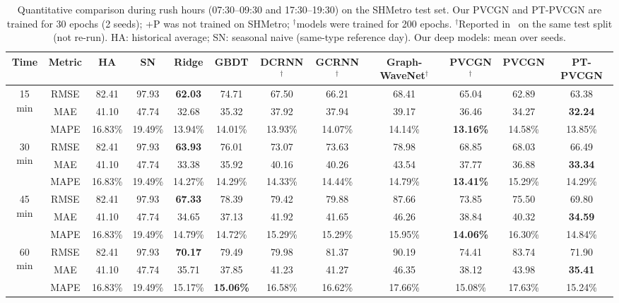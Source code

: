 \begin{table}[t]
\centering
\caption{Quantitative comparison during rush hours (07:30--09:30 and 17:30--19:30) on the SHMetro test set. Our PVCGN and PT-PVCGN are trained for 30 epochs (2 seeds); +P was not trained on SHMetro; $^\dagger$models were trained for 200 epochs. $^\dagger$Reported in~\cite{liu2022pvcgn} on the same test split (not re-run). HA: historical average; SN: seasonal naive (same-type reference day). Our deep models: mean over seeds.}
\label{tab:sh-rush}
\scriptsize
\setlength{\tabcolsep}{3.2pt}
\begin{tabular}{cc|cccc|cccc|cc}
\toprule
Time & Metric & HA & SN & Ridge & GBDT & DCRNN$^\dagger$ & GCRNN$^\dagger$ & Graph-WaveNet$^\dagger$ & PVCGN$^\dagger$ & PVCGN & PT-PVCGN \\
\midrule
\multirow{3}{*}{15 min} & RMSE & 82.41 & 97.93 & \textbf{62.03} & 74.71 & 67.50 & 66.21 & 68.41 & 65.04 & 62.89 & 63.38 \\
 & MAE & 41.10 & 47.74 & 32.68 & 35.32 & 37.92 & 37.94 & 39.17 & 36.46 & 34.27 & \textbf{32.24} \\
 & MAPE & 16.83\% & 19.49\% & 13.94\% & 14.01\% & 13.93\% & 14.07\% & 14.14\% & \textbf{13.16\%} & 14.58\% & 13.85\% \\
\midrule
\multirow{3}{*}{30 min} & RMSE & 82.41 & 97.93 & \textbf{63.93} & 76.01 & 73.07 & 73.63 & 78.98 & 68.85 & 68.03 & 66.49 \\
 & MAE & 41.10 & 47.74 & 33.38 & 35.92 & 40.16 & 40.26 & 43.54 & 37.77 & 36.88 & \textbf{33.34} \\
 & MAPE & 16.83\% & 19.49\% & 14.27\% & 14.29\% & 14.33\% & 14.44\% & 14.79\% & \textbf{13.41\%} & 15.29\% & 14.29\% \\
\midrule
\multirow{3}{*}{45 min} & RMSE & 82.41 & 97.93 & \textbf{67.33} & 78.39 & 79.42 & 79.88 & 87.66 & 73.85 & 75.50 & 69.80 \\
 & MAE & 41.10 & 47.74 & 34.65 & 37.13 & 41.92 & 41.65 & 46.26 & 38.84 & 40.32 & \textbf{34.59} \\
 & MAPE & 16.83\% & 19.49\% & 14.79\% & 14.72\% & 15.29\% & 15.29\% & 15.95\% & \textbf{14.06\%} & 16.30\% & 14.84\% \\
\midrule
\multirow{3}{*}{60 min} & RMSE & 82.41 & 97.93 & \textbf{70.17} & 79.49 & 79.98 & 81.37 & 90.19 & 74.41 & 83.74 & 71.90 \\
 & MAE & 41.10 & 47.74 & 35.71 & 37.85 & 41.23 & 41.27 & 46.35 & 38.12 & 43.98 & \textbf{35.41} \\
 & MAPE & 16.83\% & 19.49\% & 15.17\% & \textbf{15.06\%} & 16.58\% & 16.62\% & 17.66\% & 15.08\% & 17.63\% & 15.24\% \\
\bottomrule
\end{tabular}
\end{table}